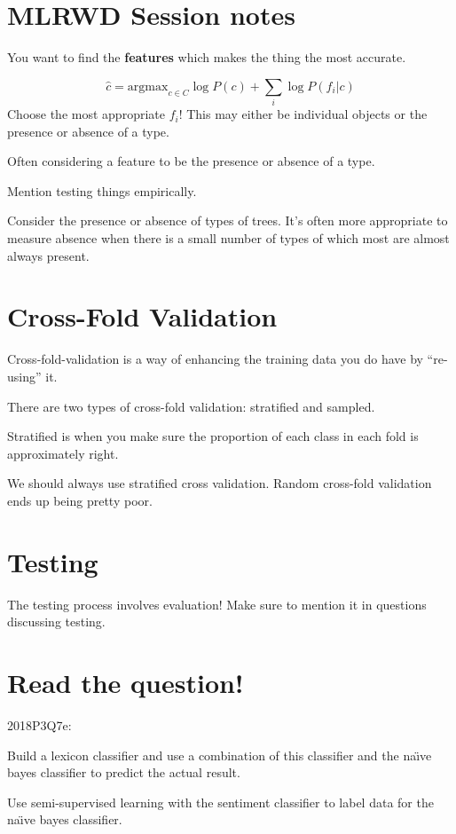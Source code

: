 \documentclass[10pt, a4paper]{article}
\begin{document}
\section*{MLRWD Session notes}

You want to find the \textbf{features} which makes the thing the most accurate.

\[
\hat{c} = \text{argmax}_{c \in C} \log P(c) + \sum_i \log P(f_i|c)
\]
Choose the most appropriate $f_i$! This may either be individual objects or the
presence or absence of a type.

Often considering a feature to be the presence or absence of a type.

Mention testing things empirically.

Consider the presence or absence of types of trees. It's often more appropriate to measure
absence when there is a small number of types of which most are almost always present.

\section{Cross-Fold Validation}

Cross-fold-validation is a way of enhancing the training data you do have
by ``re-using'' it.

There are two types of cross-fold validation: stratified and sampled.

Stratified is when you make sure the proportion of each class in each fold is approximately right.

We should always use stratified cross validation. Random cross-fold validation ends up
being pretty poor.

\section{Testing}

The testing process involves evaluation! Make sure to mention it in questions discussing
testing.

\section{Read the question!}

2018P3Q7e:

Build a lexicon classifier and use a combination of this classifier and the
na\"{\i}ve bayes classifier to predict the actual result.

Use semi-supervised learning with the sentiment classifier to label data for the na\"{\i}ve bayes
classifier.
\end{document}

